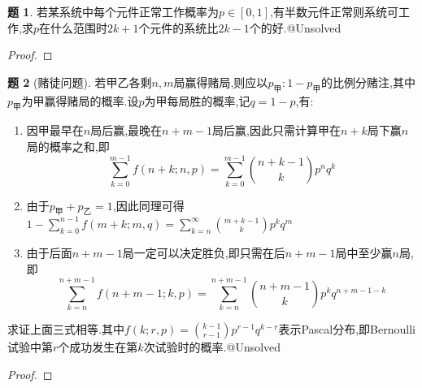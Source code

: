 \documentclass{article}
\theoremstyle{definition}
\newtheorem{exercise}{题}[section]
\begin{document}
\begin{exercise}
    若某系统中每个元件正常工作概率为$p\in [0,1]$,有半数元件正常则系统可工作,求$p$在什么范围时$2k+1$个元件的系统比$2k-1$个的好.@Unsolved
\end{exercise}
\begin{proof}
    
\end{proof}

\begin{exercise}[赌徒问题]
    若甲乙各剩$n,m$局赢得赌局,则应以$p_{\text{甲}}:1-p_{\text{甲}}$的比例分赌注,其中$p_{\text{甲}}$为甲赢得赌局的概率.设$p$为甲每局胜的概率,记$q=1-p$,有:
    \begin{enumerate}
        \item 因甲最早在$n$局后赢,最晚在$n+m-1$局后赢,因此只需计算甲在$n+k$局下赢$n$局的概率之和,即$$\sum_{k=0}^{m-1}f(n+k;n,p)=\sum_{k=0}^{m-1}\binom{n+k-1}{k}p^n q^k$$
        \item 由于$p_{\text{甲}}+p_{\text{乙}}=1$,因此同理可得$1-\sum_{k=0}^{n-1}f(m+k;m,q)=\sum_{k=n}^\infty \binom{m+k-1}{k}p^kq^m$
        \item 由于后面$n+m-1$局一定可以决定胜负,即只需在后$n+m-1$局中至少赢$n$局,即$$\sum_{k=n}^{n+m-1}f(n+m-1;k,p)=\sum_{k=n}^{n+m-1}\binom{n+m-1}{k}p^kq^{n+m-1-k}$$
    \end{enumerate}
    
    求证上面三式相等.其中$f(k;r,p)=\binom{k-1}{r-1}p^{r-1}q^{k-r}$表示Pascal分布,即Bernoulli试验中第$r$个成功发生在第$k$次试验时的概率.@Unsolved
\end{exercise}
\begin{proof}
    
\end{proof}
\end{document}
